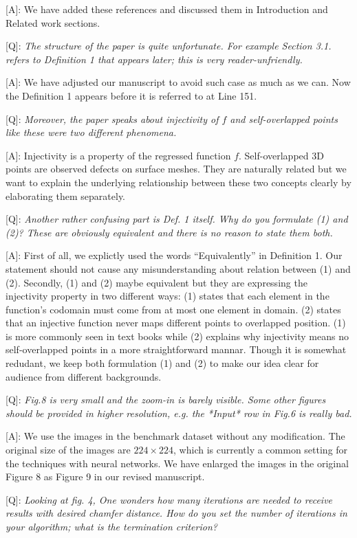 \documentclass[10pt]{letter} %
\begin{document}
	[A]: We have added these references and discussed them in Introduction and Related work sections.
	
	[Q]: \emph{The structure of the paper is quite unfortunate. For example Section 3.1. refers to Definition 1 that appears later; this is very reader-unfriendly.}
	
	[A]: We have adjusted our manuscript to avoid such case as much as we can. Now the Definition 1 appears before it is referred to at Line 151.
	
	[Q]: \emph{Moreover, the paper speaks about injectivity of $f$ and self-overlapped points like these were two different phenomena.}
	
	[A]: Injectivity is a property of the regressed function $f$. Self-overlapped 3D points are observed defects on surface meshes. They are naturally related but we want to explain the underlying relationship between these two concepts clearly by elaborating them separately.
	
	[Q]: \emph{Another rather confusing part is Def. 1 itself. Why do you formulate (1) and (2)? These are obviously equivalent and there is no reason to state them both.}
	
	[A]: First of all, we explictly used the words ``Equivalently'' in Definition 1. Our statement should not cause any misunderstanding about relation between (1) and (2). Secondly, (1) and (2) maybe equivalent but they are expressing the injectivity property in two different ways: (1) states that each element in the function's codomain must come from at most one element in domain. (2) states that an injective function never maps different points to overlapped position. (1) is more commonly seen in text books while (2) explains why injectivity means no self-overlapped points in a more straightforward mannar. Though it is somewhat redudant, we keep both formulation (1) and (2) to make our idea clear for audience from different backgrounds.
	
	[Q]: \emph{Fig.8 is very small and the zoom-in is barely visible.  Some other figures should be provided in higher resolution, e.g. the *Input* row in Fig.6 is really bad.} 
	
	[A]: We use the images in the benchmark dataset without any modification. The original size of the images are $224 \times 224$, which is currently a common setting for the techniques with neural networks. We have enlarged the images in the original Figure 8 as Figure 9 in our revised manuscript.
	
	[Q]: \emph{Looking at fig. 4, One wonders how many iterations are needed to receive results with desired chamfer distance. How do you set the number of iterations in your algorithm; what is the termination criterion?}
	
\end{document}
